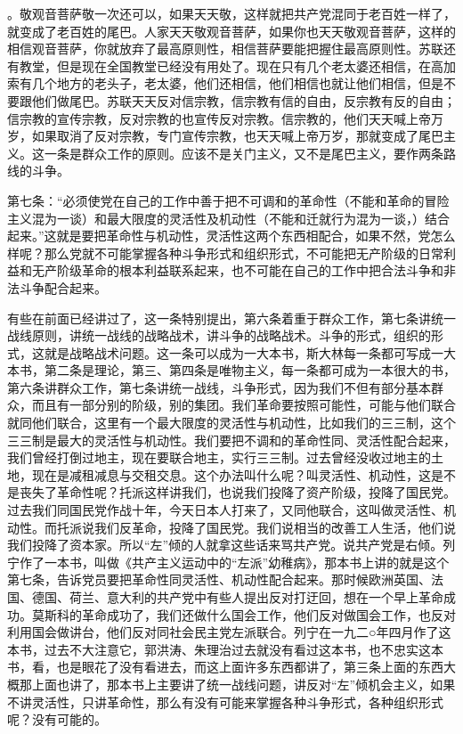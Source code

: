。敬观音菩萨敬一次还可以，如果天天敬，这样就把共产党混同于老百姓一样了，就变成了老百姓的尾巴。人家天天敬观音菩萨，如果你也天天敬观音菩萨，这样的相信观音菩萨，你就放弃了最高原则性，相信菩萨要能把握住最高原则性。苏联还有教堂，但是现在全国教堂已经没有用处了。现在只有几个老太婆还相信，在高加索有几个地方的老头子，老太婆，他们还相信，他们相信也就让他们相信，但是不要跟他们做尾巴。苏联天天反对信宗教，信宗教有信的自由，反宗教有反的自由；信宗教的宣传宗教，反对宗教的也宣传反对宗教。信宗教的，他们天天喊上帝万岁，如果取消了反对宗教，专门宣传宗教，也天天喊上帝万岁，那就变成了尾巴主义。这一条是群众工作的原则。应该不是关门主义，又不是尾巴主义，要作两条路线的斗争。

第七条：“必须使党在自己的工作中善于把不可调和的革命性（不能和革命的冒险主义混为一谈）和最大限度的灵活性及机动性（不能和迁就行为混为一谈，）结合起来。”这就是要把革命性与机动性，灵活性这两个东西相配合，如果不然，党怎么样呢？那么党就不可能掌握各种斗争形式和组织形式，不可能把无产阶级的日常利益和无产阶级革命的根本利益联系起来，也不可能在自己的工作中把合法斗争和非法斗争配合起来。

有些在前面已经讲过了，这一条特别提出，第六条着重于群众工作，第七条讲统一战线原则，讲统一战线的战略战术，讲斗争的战略战术。斗争的形式，组织的形式，这就是战略战术问题。这一条可以成为一大本书，斯大林每一条都可写成一大本书，第二条是理论，第三、第四条是唯物主义，每一条都可成为一本很大的书，第六条讲群众工作，第七条讲统一战线，斗争形式，因为我们不但有部分基本群众，而且有一部分别的阶级，别的集团。我们革命要按照可能性，可能与他们联合就同他们联合，这里有一个最大限度的灵活性与机动性，比如我们的三三制，这个三三制是最大的灵活性与机动性。我们要把不调和的革命性同、灵活性配合起来，我们曾经打倒过地主，现在要联合地主，实行三三制。过去曾经没收过地主的土地，现在是减租减息与交租交息。这个办法叫什么呢？叫灵活性、机动性，这是不是丧失了革命性呢？托派这样讲我们，也说我们投降了资产阶级，投降了国民党。过去我们同国民党作战十年，今天日本人打来了，又同他联合，这叫做灵活性、机动性。而托派说我们反革命，投降了国民党。我们说相当的改善工人生活，他们说我们投降了资本家。所以“左”倾的人就拿这些话来骂共产党。说共产党是右倾。列宁作了一本书，叫做《共产主义运动中的“左派”幼稚病》，那本书上讲的就是这个第七条，告诉党员要把革命性同灵活性、机动性配合起来。那时候欧洲英国、法国、德国、荷兰、意大利的共产党中有些人提出反对打迂回，想在一个早上革命成功。莫斯科的革命成功了，我们还做什么国会工作，他们反对做国会工作，也反对利用国会做讲台，他们反对同社会民主党左派联合。列宁在一九二○年四月作了这本书，过去不大注意它，郭洪涛、朱理治过去就没有看过这本书，也不忠实这本书，看，也是眼花了没有看进去，而这上面许多东西都讲了，第三条上面的东西大概那上面也讲了，那本书上主要讲了统一战线问题，讲反对“左”倾机会主义，如果不讲灵活性，只讲革命性，那么有没有可能来掌握各种斗争形式，各种组织形式呢？没有可能的。

